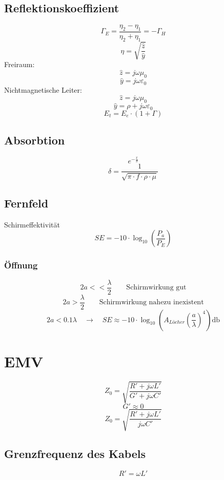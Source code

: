 \documentclass[a4paper, 10pt, fleqn]{article}
\begin{document}
\subsection{Reflektionskoeffizient}
\[ \Gamma_E = \frac{\eta_2 - \eta_1}{\eta_2 + \eta_1} = -\Gamma_H \]
\[ \eta = \sqrt{\frac{\hat{z}}{\hat{y}}} \]
Freiraum: 
\[ \hat{z} = j \omega\mu_0 \]
\[ \hat{y} = j \omega \varepsilon_0 \]
Nichtmagnetische Leiter:
\[ \hat{z} = j \omega\mu_0 \]
\[ \hat{y} = \rho + j \omega \varepsilon_0 \]
\[ E_t = E_e \cdot (1 + \Gamma) \]

\subsection{Absorbtion}
\[ e^{-\frac{x}{\delta}} \]
\[ \delta = \frac{1}{\sqrt{\pi \cdot f \cdot \rho \cdot \mu}} \]

\subsection{Fernfeld}
Schirmeffektivität
\[ SE = - 10 \cdot \log_{10}\left(\frac{P_a}{P_E}\right) \]

\subsubsection{Öffnung}
\[ 2a << \frac{\lambda}{2} \qquad \text{Schirmwirkung gut} \]
\[ 2a > \frac{\lambda}{2} \qquad \text{Schirmwirkung nahezu inexistent} \]
\[ 2a < 0.1 \lambda \quad \rightarrow \quad SE \approx -10 \cdot \log_{10}\left(A_{Löcher}\left(\frac{a}{\lambda}\right)^4\right) \si{\decibel} \]

\section{EMV}
\[ Z_0 = \sqrt{\frac{R' + j \omega L'}{G' + j \omega C'}} \]
\[ G' \approx 0 \]
\[ Z_0 = \sqrt{\frac{R' + j \omega L'}{j  \omega C'}} \]

\subsection{Grenzfrequenz des Kabels}
\[ R' = \omega L' \]
\end{document}
